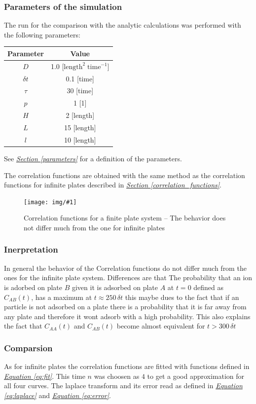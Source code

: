 \documentclass[a4paper, parskip=half]{scrartcl}
\newcommand{\myImage}[2]{
	\begin{figure}[H]
	\centering
	\texttt{[image: img/\#1]}
	\caption{#2}
	\label{pic:#1}
	\end{figure}
}
\newcommand{\myEqRef}[1]{\textit{\hyperref[eq:#1]{Equation \ref*{eq:#1}}}}
\newcommand{\mySecRef}[1]{\textit{\hyperref[#1]{Section \ref*{#1}}}}
\begin{document}
\subsubsection{Parameters of the simulation}
The run for the comparison with the analytic calculations was performed with the following parameters:
\begin{center}
\begin{tabular}{c|c}
Parameter & Value \\\hline
$D$ & 1.0 [$\mathrm{length}^2\; \mathrm{time}^{-1}$]\\
$\delta t$ & 0.1 [time]\\
$\tau$ & 30 [time]\\
$p$ & 1 [1]\\
$H$ & 2 [length] \\
$L$ & 15 [length] \\
$l$ & 10 [length]
\end{tabular}
\end{center}
See \mySecRef{parameters} for a definition of the parameters.

The correlation functions are obtained with the same method as the correlation functions for infinite plates described in \mySecRef{correlation_functions}.
\myImage{limited_correlation}{Correlation functions for a finite plate system -- The behavior does not differ much from the one for infinite plates}

\subsubsection{Inerpretation}
In general the behavior of the Correlation functions do not differ much from the ones for the infinite plate system. Differences are that The probability that an ion is adorbed on plate $B$ given it is adsorbed on plate $A$ at $t=0$ defined as $C_{AB}(t)$, has a maximum at $t \approx 250\, \delta t$ this maybe dues to the fact that if an particle is not adsorbed on a plate there is a probability that it is far away from any plate and therefore it wont adsorb with a high probability. This also explains the fact that $C_{AA}(t)$ and $C_{AB}(t)$ become almost equivalent for $t > 300\, \delta t$

\subsubsection{Comparsion}
As for infinite plates the correlation functions are fitted with functions defined in \myEqRef{fit}. This time $n$ was choosen as $4$ to get a good approximation for all four curves. The laplace transform and its error read as defined in \myEqRef{laplace} and \myEqRef{error}.
\end{document}
